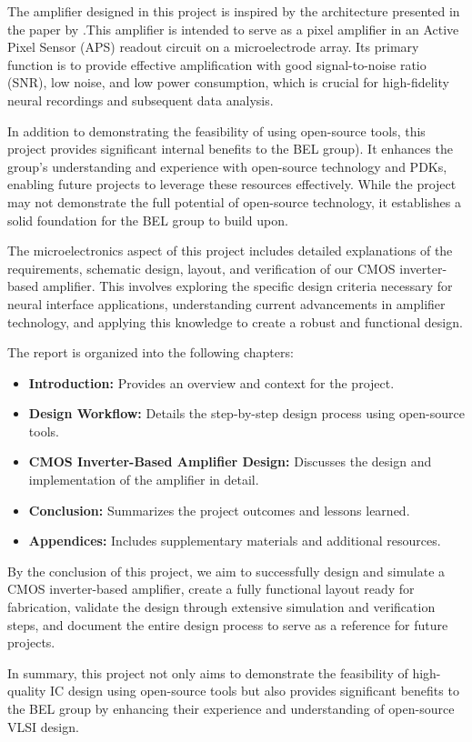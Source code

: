 The amplifier designed in this project is inspired by the architecture presented in the paper by \textcite{Yuan_Hierlemann_Frey_2021}.This amplifier is intended to serve as a pixel amplifier in an Active Pixel Sensor (APS) readout circuit on a microelectrode array. Its primary function is to provide effective amplification with good signal-to-noise ratio (SNR), low noise, and low power consumption, which is crucial for high-fidelity neural recordings and subsequent data analysis.

In addition to demonstrating the feasibility of using open-source tools, this project provides significant internal benefits to the BEL group). It enhances the group's understanding and experience with open-source technology and PDKs, enabling future projects to leverage these resources effectively. While the project may not demonstrate the full potential of open-source technology, it establishes a solid foundation for the BEL group to build upon.

The microelectronics aspect of this project includes detailed explanations of the requirements, schematic design, layout, and verification of our CMOS inverter-based amplifier. This involves exploring the specific design criteria necessary for neural interface applications, understanding current advancements in amplifier technology, and applying this knowledge to create a robust and functional design.

The report is organized into the following chapters:
\begin{itemize}
\item \textbf{Introduction:} Provides an overview and context for the project.
\item \textbf{Design Workflow:} Details the step-by-step design process using open-source tools.
\item \textbf{CMOS Inverter-Based Amplifier Design:} Discusses the design and implementation of the amplifier in detail.
\item \textbf{Conclusion:} Summarizes the project outcomes and lessons learned.
\item \textbf{Appendices:} Includes supplementary materials and additional resources.
\end{itemize}

By the conclusion of this project, we aim to successfully design and simulate a CMOS inverter-based amplifier, create a fully functional layout ready for fabrication, validate the design through extensive simulation and verification steps, and document the entire design process to serve as a reference for future projects.

In summary, this project not only aims to demonstrate the feasibility of high-quality IC design using open-source tools but also provides significant benefits to the BEL group by enhancing their experience and understanding of open-source VLSI design.